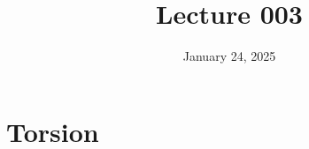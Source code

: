 \documentclass[12pt]{article}
\title{Lecture 003}
\date{January 24, 2025}
\begin{document}
\newpage

\section{Torsion}
\label{sec:torsion}
\end{document}
